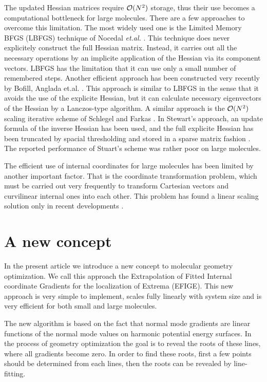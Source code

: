 \documentclass[prl,aps,twocolumn,showpacs,twocolumngrid,superbib]{revtex4}
\begin{document}
The updated Hessian matrices require ${\cal{O}}(N^{2})$ storage, thus
their use becomes a computational bottleneck for large molecules.
There are a few approaches to overcome this limitation.
The most widely used one is the Limited Memory BFGS (LBFGS) 
technique of Nocedal
{\it et.al.} \cite{nocedal_lbgs}. This technique does never explicitely 
construct the full Hessian matrix. Instead, it carries out all 
the necessary operations by an implicite application of the Hessian
via its component vectors. LBFGS
has the limitation that it can use only a small number of remembered
steps.
Another efficient approach has been constructed very recently by Bofill,
Anglada et.al. \cite{bofill_lanczos}. This approach is similar
to LBFGS in the sense that it avoids the use of the explicite
Hessian, but it can calculate necessary eigenvectors of the 
Hessian by a Lanczos-type algorithm. A
similar approach is the ${\cal{O}}(N^{2})$ scaling iterative
scheme of Schlegel and Farkas \cite{schlegel_on2iter}.
In Stewart's approach, an update
formula of the inverse Hessian has been used, and the full explicite
Hessian has been truncated by spacial thresholding and stored in a 
sparse matrix fashion \cite{Stewart_crambin_opt}. 
The reported performance
of Stuart's scheme was rather poor on large molecules.

The efficient use of internal coordinates for large molecules has 
been limited by another important factor. That is the coordinate
transformation problem, which must be carried out very frequently
to transform Cartesian vectors and curvilinear internal ones into each
other. This problem has found a linear scaling solution   
only in recent developments 
\cite{paizs_coordtrf1,nemeth_coordtrf1,paizs_coordtrf2,nemeth_coordtrf2,billeter_coordtrf,andzelm_coordtrf,kudin_coordtrf}. 


\section{A new concept}
In the present article we introduce a new concept 
to molecular geometry optimization. We call this approach the
Extrapolation of Fitted Internal coordinate
Gradients for the localization of Extrema (EFIGE).
This new approach is very simple
to implement, scales fully linearly with system size 
and is very efficient for both small and large molecules.

The new algorithm is based on the fact that
normal mode gradients are linear functions of the normal mode values 
on harmonic potential energy surfaces. 
In the process of geometry optimization the goal is to reveal the roots
of these lines, where all gradients become zero. In order to 
find these roots, first a few points should be determined from each
lines, then the roots can be revealed by line-fitting. 
\end{document}
